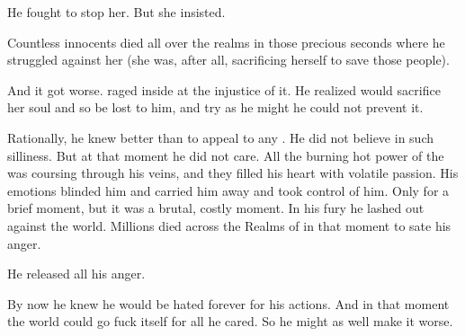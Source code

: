 He fought to stop her. 
But she insisted. 

Countless innocents died all over the realms in those precious seconds where he struggled against her (she was, after all, sacrificing herself to save those people). 

And it got worse. 
\Ishnaruchaefir{} raged inside at the injustice of it. 
He realized \Rystessakhin{} would sacrifice her soul and so be lost to him, and try as he might he could not prevent it. 

\begin{prose}
\end{prose}

Rationally, he knew better than to appeal to any . 
He did not believe in such silliness. 
But at that moment he did not care. 
All the burning hot power of the \xss{} was coursing through his veins, and they filled his heart with volatile passion. 
His emotions blinded him and carried him away and took control of him. 
Only for a brief moment, but it was a brutal, costly moment. 
In his fury he lashed out against the world.
Millions died across the Realms of \Miith{} in that moment to sate his anger. 

He released all his anger. 


By now he knew he would be hated forever for his actions. 
And in that moment the world could go fuck itself for all he cared. 
So he might as well make it worse. 


